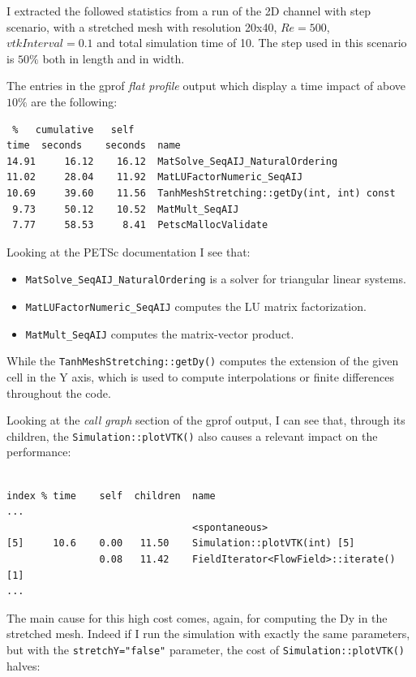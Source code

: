 \documentclass[11pt,a4paper,DIV12,pdftex]{scrartcl}
\begin{document}
I extracted the followed statistics from a run of the 2D channel with step scenario, with a stretched mesh with resolution 20x40, $Re=500$, $vtkInterval=0.1$ and total simulation time of 10. The step used in this scenario is $50\%$ both in length and in width.

The entries in the gprof \emph{flat profile} output which display a time impact of above $10\%$ are the following:
\begin{lstlisting}
 %   cumulative   self
time  seconds    seconds  name    
14.91     16.12    16.12  MatSolve_SeqAIJ_NaturalOrdering
11.02     28.04    11.92  MatLUFactorNumeric_SeqAIJ
10.69     39.60    11.56  TanhMeshStretching::getDy(int, int) const
 9.73     50.12    10.52  MatMult_SeqAIJ
 7.77     58.53     8.41  PetscMallocValidate
\end{lstlisting}

Looking at the PETSc documentation I see that:
\begin{itemize}
	\item \verb!MatSolve_SeqAIJ_NaturalOrdering! is a solver for triangular linear systems.
	\item \verb!MatLUFactorNumeric_SeqAIJ! computes the LU matrix factorization.
	\item \verb!MatMult_SeqAIJ! computes the matrix-vector product.
\end{itemize}

While the \verb!TanhMeshStretching::getDy()! computes the extension of the given cell in the Y axis, which is used to compute interpolations or finite differences throughout the code.

Looking at the \emph{call graph} section of the gprof output, I can see that, through its children, the \verb!Simulation::plotVTK()! also causes a relevant impact on the performance:

\begin{lstlisting}

index % time    self  children  name
...
                                <spontaneous>
[5]     10.6    0.00   11.50    Simulation::plotVTK(int) [5]
                0.08   11.42    FieldIterator<FlowField>::iterate() [1]
...
\end{lstlisting}

The main cause for this high cost comes, again, for computing the Dy in the stretched mesh. Indeed if I run the simulation with exactly the same parameters, but with the \verb!stretchY="false"! parameter, the cost of \verb!Simulation::plotVTK()! halves:
\end{document}
